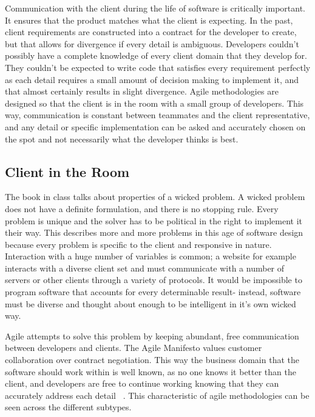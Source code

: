 \documentclass[11pt]{article}
\newcommand{\tab}{\hspace*{2em}}
\begin{document}
\begin{doublespace}
\tab Communication with the client during the life of software is critically important. It ensures that the product matches what the client is expecting. In the past, client requirements are constructed into a contract for the developer to create, but that allows for divergence if every detail is ambiguous. Developers couldn’t possibly have a complete knowledge of every client domain that they develop for. They couldn’t be expected to write code that satisfies every requirement perfectly as each detail requires a small amount of decision making to implement it, and that almost certainly results in slight divergence. Agile methodologies are designed so that the client is in the room with a small group of developers. This way, communication is constant between teammates and the client representative, and any detail or specific implementation can be asked and accurately chosen on the spot and not necessarily what the developer thinks is best.

\subsection{Client in the Room}

\tab The book in class talks about properties of a wicked problem. A wicked problem does not have a definite formulation, and there is no stopping rule. Every problem is unique and the solver has to be political in the right to implement it their way. This describes more and more problems in this age of software design because every problem is specific to the client and responsive in nature. Interaction with a huge number of variables is common; a website for example interacts with a diverse client set and must communicate with a number of servers or other clients through a variety of protocols. It would be impossible to program software that accounts for every determinable result- instead, software must be diverse and thought about enough to be intelligent in it’s own wicked way. 

\tab Agile attempts to solve this problem by keeping abundant, free communication between developers and clients. The Agile Manifesto values customer collaboration over contract negotiation. This way the business domain that the software should work within is well known, as no one knows it better than the client, and developers are free to continue working knowing that they can accurately address each detail ~\cite{Janus:2012:TCA:2237796.2237803}. This characteristic of agile methodologies can be seen across the different subtypes. 


\end{doublespace}
\end{document}
